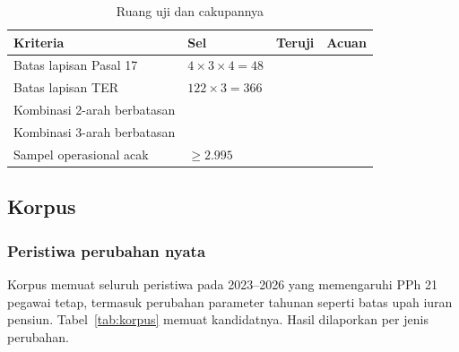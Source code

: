 \begin{table}[t]
\centering
\caption{Ruang uji dan cakupannya}
\label{tab:cakupan}
\scriptsize
\begin{tabularx}{\columnwidth}{@{}L P{1.5cm} P{0.8cm} P{0.9cm}@{}}
\toprule
\textbf{Kriteria} & \textbf{Sel} & \textbf{Teruji} & \textbf{Acuan} \\
\midrule
Batas lapisan Pasal 17 & $4 \times 3 \times 4 = 48$ & \isian{} & \isian{} \\
Batas lapisan TER & $122 \times 3 = 366$ & \isian{} & \isian{} \\
Kombinasi 2-arah berbatasan &  & \isian{} & \isian{} \\
Kombinasi 3-arah berbatasan &  & \isian{} & \isian{} \\
Sampel operasional acak & $\ge 2.995$ & \isian{} & \isian{} \\
\bottomrule
\end{tabularx}
\end{table}


\subsection{Korpus}
\label{subsec:korpus}

\subsubsection{Peristiwa perubahan nyata}
Korpus memuat seluruh peristiwa pada 2023--2026 yang memengaruhi PPh 21 pegawai tetap, termasuk perubahan parameter tahunan seperti batas upah iuran pensiun. Tabel~\ref{tab:korpus} memuat kandidatnya. Hasil dilaporkan per jenis perubahan.

